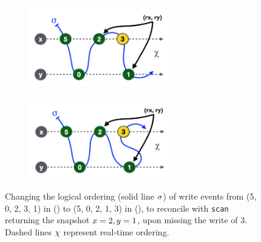 \begin{figure}[t]
\begin{subfigure}[t]{0.49\textwidth}
\includegraphics[width=6.1cm]{res/relink-before3.pdf}
\caption{\label{fig:reorder:before}} %
\end{subfigure} \hfill
\begin{subfigure}[t]{0.49\textwidth}
\includegraphics[width=6.1cm]{res/relink-after3.pdf}
\caption{\label{fig:reorder:after}} %
\end{subfigure}%
%
\caption{\label{fig:reorder} Changing the logical ordering (solid line
  $\sigma$) of write events from (5, 0, 2, 3, 1) in
  () to (5, 0, 2, 1, 3) in
  (), to reconcile with {\tt scan} returning
  the snapshot $x=2, y=1$, upon missing the write of $3$. Dashed
  lines $\chi$ represent real-time ordering.}
\end{figure}
\vspace{-1mm}
